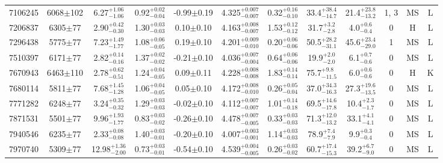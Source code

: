 \begin{longtable}{c|ccccc|ccc|ccc}
7106245 & 6068$\pm$102   & 6.27$_{-1.06}^{+1.06}$    & 0.92$_{-0.04}^{+0.02}$ & -0.99$\pm$0.19    & 4.325$_{-0.007}^{+0.007}$ & 0.32$_{-0.10}^{+0.16}$ & 33.4$_{-14.7}^{+38.4}$    & 21.4$_{-13.2}^{+23.8}$   & 1, 3 &        MS & L \\
7206837 & 6305$\pm$77    & 2.90$_{-0.30}^{+0.42}$    & 1.30$_{-0.03}^{+0.03}$ & 0.10$\pm$0.10     & 4.163$_{-0.007}^{+0.008}$ & 1.53$_{-0.12}^{+0.12}$ & 31.7$_{-2.8}^{+3.2}$      & 4.0$_{-0.4}^{+0.6}$      & 0 &        H & L \\
7296438 & 5775$\pm$77    & 7.23$_{-1.77}^{+1.49}$    & 1.08$_{-0.05}^{+0.06}$ & 0.19$\pm$0.10     & 4.201$_{-0.010}^{+0.009}$ & 0.20$_{-0.06}^{+0.06}$ & 50.5$_{-31.1}^{+28.2}$    & 45.6$_{-29.0}^{+23.4}$   & 1 &        MS & L \\
7510397 & 6171$\pm$77    & 2.82$_{-0.16}^{+0.14}$    & 1.37$_{-0.02}^{+0.02}$ & -0.21$\pm$0.10    & 4.036$_{-0.004}^{+0.007}$ & 0.64$_{-0.06}^{+0.06}$ & 19.9$_{-2.0}^{+2.0}$      & 6.1$_{-0.6}^{+0.7}$      & 0 &        MS & L \\
7670943 & 6463$\pm$110   & 2.78$_{-0.51}^{+0.62}$    & 1.24$_{-0.05}^{+0.04}$ & 0.09$\pm$0.11     & 4.228$_{-0.008}^{+0.008}$ & 1.83$_{-0.14}^{+0.14}$ & 75.7$_{-11.5}^{+9.8}$     & 6.0$_{-0.6}^{+0.6}$      & 0 &        H & K \\
7680114 & 5811$\pm$77    & 7.68$_{-1.28}^{+1.45}$    & 1.06$_{-0.05}^{+0.04}$ & 0.05$\pm$0.10     & 4.172$_{-0.010}^{+0.008}$ & 0.26$_{-0.04}^{+0.05}$ & 37.0$_{-16.3}^{+34.3}$    & 27.3$_{-13.5}^{+19.6}$   & 0 &        MS & L \\
7771282 & 6248$\pm$77    & 3.24$_{-0.32}^{+0.35}$    & 1.29$_{-0.03}^{+0.03}$ & -0.02$\pm$0.10    & 4.112$_{-0.007}^{+0.007}$ & 1.01$_{-0.18}^{+0.14}$ & 69.5$_{-17.8}^{+14.6}$    & 10.4$_{-1.7}^{+2.3}$     & 0 &        MS & L \\
7871531 & 5501$\pm$77    & 9.96$_{-1.77}^{+1.93}$    & 0.83$_{-0.02}^{+0.03}$ & -0.26$\pm$0.10    & 4.478$_{-0.005}^{+0.007}$ & 0.33$_{-0.03}^{+0.03}$ & 71.3$_{-13.2}^{+12.0}$    & 33.1$_{-4.1}^{+4.1}$     & 0 &        MS & L \\
7940546 & 6235$\pm$77    & 2.33$_{-0.08}^{+0.08}$    & 1.40$_{-0.01}^{+0.03}$ & -0.20$\pm$0.10    & 4.007$_{-0.001}^{+0.003}$ & 1.14$_{-0.03}^{+0.03}$ & 78.9$_{-7.9}^{+7.4}$      & 9.9$_{-0.4}^{+0.3}$      & 0 &        MS & L \\
7970740 & 5309$\pm$77    & 12.98$_{-2.00}^{+1.36}$   & 0.73$_{-0.01}^{+0.03}$ & -0.54$\pm$0.10    & 4.539$_{-0.005}^{+0.004}$ & 0.26$_{-0.02}^{+0.03}$ & 60.7$_{-15.3}^{+17.4}$    & 39.2$_{-9.0}^{+6.7}$     & 0 &        MS & L \\

\end{longtable}
